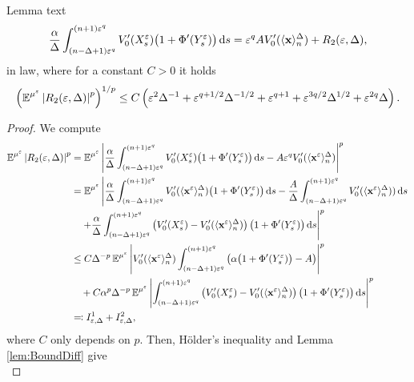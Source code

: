 \documentclass[10pt]{article}
\begin{document}
\begin{lemma} Lemma text
	\begin{equation}
		\frac{\alpha}{\Delta} \int_{(n-\Delta+1)\varepsilon^q}^{(n+1)\varepsilon^q} V_0'(X^\varepsilon_s)\big(1 + \Phi'(Y^\varepsilon_s)\big)\,\mathrm{d} s = \varepsilon^q A V_0'(\langle \mathbf x \rangle^\Delta_{n}) + R_2(\varepsilon, \Delta),
	\end{equation}
	in law, where for a constant $C > 0$ it holds
	\begin{equation}
		\left(\operatorname{\mathbb{E}}^{\mu^\varepsilon}\left\lvert R_2(\varepsilon, \Delta)\right\rvert^p\right)^{1/p}\leq C\left(\varepsilon^2\Delta^{-1} + \varepsilon^{q+1/2}\Delta^{-1/2} + \varepsilon^{q+1} + \varepsilon^{3q/2}\Delta^{1/2} + \varepsilon^{2q}\Delta  \right).
	\end{equation}
\end{lemma}
\begin{proof} We compute
	\begin{equation} 
	\begin{aligned}
		\operatorname{\mathbb{E}}^{\mu^\varepsilon}\left\lvert R_2(\varepsilon, \Delta)\right\rvert^p 
		&= \operatorname{\mathbb{E}}^{\mu^\varepsilon}\left\lvert\frac{\alpha}{\Delta} \int_{(n-\Delta+1)\varepsilon^q}^{(n+1)\varepsilon^q} V_0'(X^\varepsilon_s)\big(1 + \Phi'(Y^\varepsilon_s)\big)\,\mathrm{d} s - A\varepsilon^q V_0'(\langle \mathbf x^\varepsilon \rangle^\Delta_n)\right\rvert^p \\
		&= \operatorname{\mathbb{E}}^{\mu^\varepsilon}\left|\frac{\alpha}{\Delta} \int_{(n-\Delta+1)\varepsilon^q}^{(n+1)\varepsilon^q} V_0'(\langle \mathbf x^\varepsilon \rangle^\Delta_n)\big(1 + \Phi'(Y^\varepsilon_s)\big)\,\mathrm{d} s - \frac{A}{\Delta}\int_{(n-\Delta+1)\varepsilon^q}^{(n+1)\varepsilon^q} V_0'(\langle \mathbf x^\varepsilon \rangle^\Delta_n)) \,\mathrm{d} s\right.\\
		&\quad \left. + \frac{\alpha}{\Delta}\int_{(n-\Delta+1)\varepsilon^q}^{(n+1)\varepsilon^q} \left(V_0'(X^\varepsilon_s) - V_0'(\langle \mathbf x^\varepsilon \rangle^\Delta_n)\right)\big(1 + \Phi'(Y^\varepsilon_s)\big) \,\mathrm{d} s\right|^p\\
		&\leq C \Delta^{-p} \operatorname{\mathbb{E}}^{\mu^\varepsilon}\left\lvert V_0'(\langle \mathbf x^\varepsilon \rangle^\Delta_n)\int_{(n-\Delta+1)\varepsilon^q}^{(n+1)\varepsilon^q} \left(\alpha\big(1 + \Phi'(Y^\varepsilon_s)\big) -  A\right)\right\rvert^p\\
		&\quad+ C\alpha^p \Delta^{-p} \operatorname{\mathbb{E}}^{\mu^\varepsilon}\left\lvert\int_{(n-\Delta+1)\varepsilon^q}^{(n+1)\varepsilon^q} \left(V_0'(X^\varepsilon_s) - V_0'(\langle \mathbf x^\varepsilon \rangle^\Delta_n)\right)\big(1 + \Phi'(Y^\varepsilon_s)\big) \,\mathrm{d} s\right\rvert^p\\
		& \eqqcolon I_{\varepsilon, \Delta}^1 + I_{\varepsilon, \Delta}^2,
	\end{aligned}
	\end{equation}
	where $C$ only depends on $p$. Then, Hölder's inequality and Lemma \ref{lem:BoundDiff} give
	\begin{equation}

\end{equation}
\end{proof}
\end{document}
